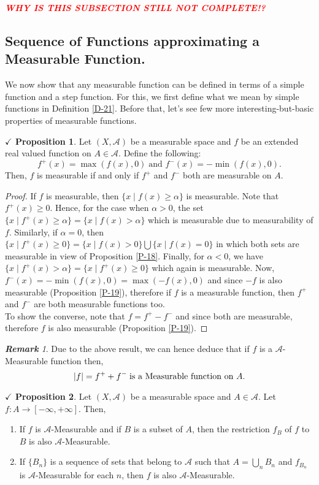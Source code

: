 \documentclass{article}
\theoremstyle{definition}
\theoremstyle{remark}
\newtheorem*{remark}{\textbf{Remark}}
\theoremstyle{definition}
\theoremstyle{definition}
\newtheorem{proposition}{$\checkmark$ Proposition}
\theoremstyle{definition}
\newcommand{\abs}[1]{\left \vert #1\right \vert}
\newcommand{\bunion}{\bigcup}
\newcommand{\where}{\;\vert\;}
\newcommand{\alg}[1]{\mathscr{#1}}
\begin{document}
\textcolor{red}{\emph{\textbf{WHY IS THIS SUBSECTION STILL NOT COMPLETE!?}}}
\newpage
\subsection{Sequence of Functions approximating a Measurable Function.}
We now show that any measurable function can be defined in terms of a simple function and a step function. For this, we first define what we mean by simple functions in Definition \ref{D-21}. Before that, let's see few more interesting-but-basic properties of measurable functions. 
\begin{proposition}\label{P-25}
	Let $ (X,\alg{A}) $ be a measurable space and $ f $ be an extended real valued function on $ A\in \alg{A} $. Define the following:
	\[f^{+}(x) = \max (f(x),0)\;\text{and } f^{-}(x) = -\min (f(x),0).\]
	Then, $ f $ is measurable if and only if $ f^{+} $ and $ f^{-} $ both are measurable on $ A $.
\end{proposition}
\begin{proof}
	If $ f $ is measurable, then $ \{x\where f(x)\ge \alpha\} $ is measurable. Note that $ f^{+}(x) \ge 0$. Hence, for the case when $ \alpha > 0 $, the set $ \{x\where f^{+}(x)\ge \alpha\} = \{x\where f(x) > \alpha\}$ which is measurable due to measurability of $ f $. Similarly, if $ \alpha = 0 $, then $ \{x\where f^{+}(x)\ge 0\} = \{x\where f(x)> 0\} \bunion \{x\where f(x) = 0\} $ in which both sets are measurable in view of Proposition \ref{P-18}. Finally, for $ \alpha<0 $, we have $ \{x\where f^{+}(x)> \alpha\} = \{x\where f^{+}(x)\ge 0\}$ which again is measurable. Now, $ f^{-}(x) = -\min(f(x),0) = \max(-f(x),0)$ and since $ -f $ is also measurable (Proposition \ref{P-19}), therefore if $ f $ is a measurable function, then $ f^{+} $ and $ f^{-} $ are both measurable functions too.\\
	To show the converse, note that $ f = f^{+} - f^{-} $ and since both are measurable, therefore $ f $ is also measurable (Proposition \ref{P-19}).
\end{proof}
\begin{remark}
	Due to the above result, we can hence deduce that if $ f $ is a $ \alg{A} $-Measurable function then,
	\[\abs{f} = f^{+} + f^{-}\;\text{is a Measurable function on $ A $.}\]
\end{remark}
\hrulefill
\begin{proposition}
	Let $ (X,\alg{A}) $ be a measurable space and $ A\in \alg{A} $. Let $ f : A\to [-\infty,+\infty]$. Then,
	\begin{enumerate}
		\item {If $ f $ is $ \alg{A} $-Measurable and if $ B $ is a subset of $ A $, then the restriction $ f_{B} $ of $ f $ to $ B $ is also $ \alg{A} $-Measurable. }
		\item {If $ \{B_n\} $ is a sequence of sets that belong to $ \alg{A} $ such that $ A = \bunion_{n}B_n $ and $ f_{B_n} $ is $ \alg{A}$-Measurable for each $ n $, then $ f $ is also $ \alg{A} $-Measurable.}
	\end{enumerate}
\end{proposition}
\end{document}

